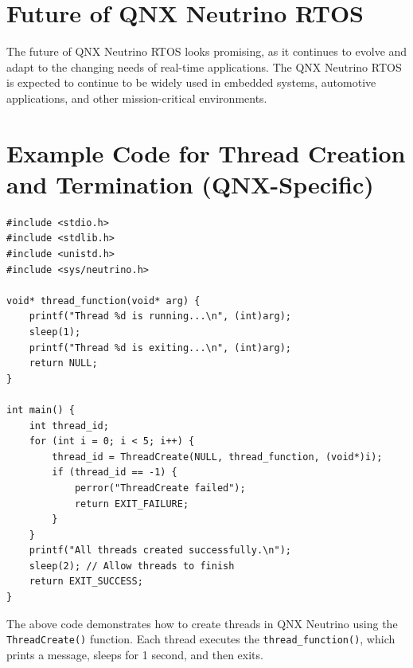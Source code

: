 \documentclass{article}
\begin{document}
\section{Future of QNX Neutrino RTOS}
\label{sec:future-qnx}
The future of QNX Neutrino RTOS looks promising, as it continues to evolve and adapt to the changing needs of real-time applications.
The QNX Neutrino RTOS is expected to continue to be widely used in embedded systems, automotive applications, and other mission-critical environments.
\FloatBarrier
\section{Example Code for Thread Creation and Termination (QNX-Specific)}
\label{sec:example-code-threadcreate}
\begin{verbatim}
#include <stdio.h>
#include <stdlib.h>
#include <unistd.h>
#include <sys/neutrino.h>

void* thread_function(void* arg) {
    printf("Thread %d is running...\n", (int)arg);
    sleep(1);
    printf("Thread %d is exiting...\n", (int)arg);
    return NULL;
}

int main() {
    int thread_id;
    for (int i = 0; i < 5; i++) {
        thread_id = ThreadCreate(NULL, thread_function, (void*)i);
        if (thread_id == -1) {
            perror("ThreadCreate failed");
            return EXIT_FAILURE;
        }
    }
    printf("All threads created successfully.\n");
    sleep(2); // Allow threads to finish
    return EXIT_SUCCESS;
}
\end{verbatim}
The above code demonstrates how to create threads in QNX Neutrino using the \texttt{ThreadCreate()} function.
Each thread executes the \texttt{thread\_function()}, which prints a message, sleeps for 1 second, and then exits.
\FloatBarrier
\end{document}
